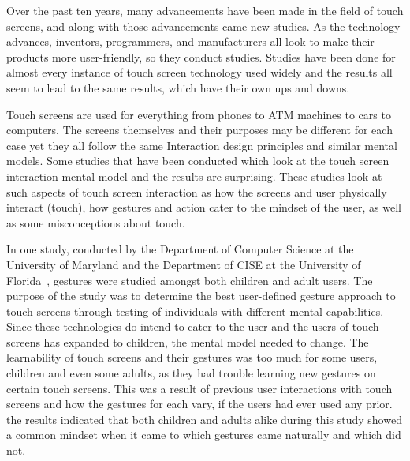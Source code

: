 \documentclass[12pt]{article} %
\begin{document}
     Over the past ten years, many advancements have been made in the field of touch screens, and along with those advancements came new studies. As the technology advances, inventors, programmers, and manufacturers all look to make their products more user-friendly, so they conduct studies. Studies have been done for almost every instance of touch screen technology used widely and the results all seem to lead to the same results, which have their own ups and downs.

     Touch screens are used for everything from phones to ATM machines to cars to computers. The screens themselves and their purposes may be different for each case yet they all follow the same Interaction design principles and similar mental models. Some studies that have been conducted which look at the touch screen interaction mental model and the results are surprising. These studies look at such aspects of touch screen interaction as how the screens and user physically interact (touch), how gestures and action cater to the mindset of the user, as well as some misconceptions about touch. 
     
     In one study, conducted by the Department of Computer Science at the University of Maryland and the Department of CISE at the University of Florida~\cite{Gestures}, gestures were studied amongst both children and adult users. The purpose of the study was to determine the best user-defined gesture approach to touch screens through testing of individuals with different mental capabilities. Since these technologies do intend to cater to the user and the users of touch screens has expanded to children, the mental model needed to change. The learnability of touch screens and their gestures was too much for some users, children and even some adults, as they had trouble learning new gestures on certain touch screens.
This was a result of previous user interactions with touch screens and how the gestures for each vary, if the users had ever used any prior. the results indicated that both children and adults alike during this study showed a common mindset when it came to which gestures came naturally and which did not. 
     
\end{document}
